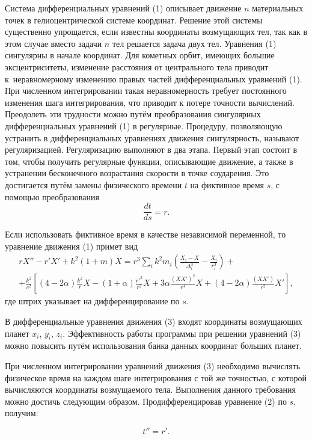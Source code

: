 Система дифференциальных уравнений (1) описывает движение $n$  материальных точек в гелиоцентрической системе координат. Решение этой системы существенно упрощается, если известны координаты возмущающих тел, так как в этом случае вместо задачи $n$ тел решается задача двух тел. Уравнения (1) сингулярны в начале координат.
Для кометных орбит, имеющих большие эксцентриситеты, изменение расстояния от центрального тела приводит к~неравномерному изменению правых частей дифференциальных уравнений (1).
При численном интегрировании такая неравномерность требует постоянного изменения шага интегрирования, что приводит к потере точности вычислений. Преодолеть эти трудности можно путём преобразования сингулярных дифференциальных уравнений (1) в регулярные.
Процедуру, позволяющую устранить в дифференциальных уравнениях движения сингулярность, называют регуляризацией.
Регуляризацию выполняют в два этапа. Первый этап состоит в том, чтобы получить регулярные функции, описывающие движение, а также в устранении бесконечного возрастания скорости в точке соударения. Это достигается путём замены физического времени $t$ на фиктивное время $s$, с помощью преобразования
\begin{equation}
\frac{dt}{ds}=r.
\end{equation}

Если использовать фиктивное время в качестве независимой переменной, то уравнение движения (1) примет вид
\begin{multline}
 rX''-r'X'+k^2(1+m)X=r^3 \sum_i{k^2m_i\left(\frac{X_i-X}{\Delta^3_i}-\frac{X_i}{r^3_i}\right)}+\\
+\frac{k^2}{c^2}\left[ (4-2\alpha)\frac{k^2}{r}X- (1+\alpha)
\frac{{r'}^2}{r^2}X+3\alpha \frac{(XX')^2}{r^4}X+ (4-2\alpha)\frac{(XX')}{r^2}X'\right],
\end{multline}
где штрих указывает на дифференцирование по $s$.

В дифференциальные уравнения движения  (3) входят координаты возмущающих планет $x_i$, $y_i$, $z_i$.
Эффективность работы программы при решении  уравнений  (3)  можно повысить путём использования   банка данных координат больших планет.

При численном интегрировании уравнений движения (3) необходимо вычислять физическое время на каждом шаге интегрирования с той же точностью, с которой вычисляются координаты возмущаемого тела. Выполнения данного требования можно достичь следующим образом. Продифференцировав уравнение (2) по $s$, получим:

\begin{equation}
t''=r'.
\end{equation}

